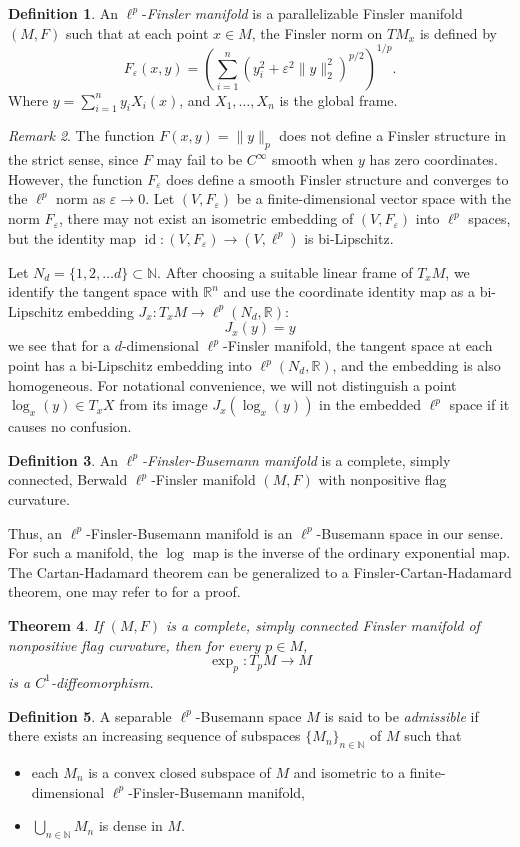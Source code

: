 \documentclass{article}
\theoremstyle{plain}
\newtheorem{theorem}{Theorem}[section]
\theoremstyle{definition}
\newtheorem{definition}[theorem]{Definition}
\renewcommand{\epsilon}{\varepsilon}
\theoremstyle{remark}
\newtheorem{remark}[theorem]{Remark}
\DeclareMathOperator{\id}{id}
\def\IR{\mathbb R}
\def\IN{\mathbb N}
\begin{document}
	\begin{definition}
	An $\ell^p$-\emph{Finsler manifold} is a parallelizable Finsler manifold $(M, F)$ such that at each point $x\in M$, the Finsler norm on $TM_x$ is defined by
	$$F_{\epsilon}(x,y)=\left(\sum_{i=1}^n(y_i^2+\varepsilon^2\|y\|_2^2)^{p/2}\right)^{1/p}.$$
	Where $y=\sum_{i=1}^n y_iX_i(x)$, and $X_1,\ldots,X_n$ is the global frame.
\end{definition}
	\begin{remark}
		The function $F(x,y)=\|y\|_p$ does not define a Finsler structure in the strict sense, since $F$ may fail to be $C^\infty$ smooth when $y$ has zero coordinates. However, the function $F_{\epsilon}$ does define a smooth Finsler structure and converges to the $\ell^p$ norm as $\epsilon\to 0$. Let $(V,F_{\epsilon})$ be a finite-dimensional vector space with the norm $F_{\epsilon}$, there may not exist an isometric embedding of $(V,F_{\epsilon})$ into $\ell^p$ spaces, but the identity map $\id:(V,F_{\epsilon}) \to (V,\ell^p)$ is bi-Lipschitz. 
	\end{remark}
	Let $N_d=\{1,2,\dots d\}\subset \IN$. After choosing a suitable linear frame of \(T_xM\), we identify the tangent space with \(\mathbb R^n\) and use the coordinate identity map as a bi-Lipschitz embedding $J_x: T_xM\to \ell^p(N_d,\IR)$:
	$$J_x(y)=y$$ we see that for a $d$-dimensional $\ell^p$-Finsler manifold, the tangent space at each point has a bi-Lipschitz embedding into $\ell^p(N_d,\IR)$, and the embedding is also homogeneous. For notational convenience, we will not distinguish a point $\log_x(y) \in T_xX$ from its image $J_x(\log_x(y))$ in the embedded $\ell^p$ space if it causes no confusion.
	\begin{definition}
		An \emph{$\ell^p$-Finsler-Busemann manifold} is a complete, simply connected, Berwald $\ell^p$-Finsler manifold $(M, F)$ with nonpositive flag curvature. 
	\end{definition}
	Thus, an $\ell^p$-Finsler-Busemann manifold is an $\ell^p$-Busemann space in our sense. For such a manifold, the $\log$ map is the inverse of the ordinary exponential map. The Cartan-Hadamard theorem can be generalized to a Finsler-Cartan-Hadamard theorem, one may refer to \cite{BaoChernShen2000} for a  proof.
	\begin{theorem}
		If $(M,F)$ is a complete, simply connected Finsler manifold of nonpositive flag curvature, then for every $p\in M$,
		$$
		\exp_p:T_pM\longrightarrow M
		$$
		is a $C^1$-diffeomorphism.
	\end{theorem}
	\begin{definition}
		A separable $\ell^p$-Busemann space $M$ is said to be \emph{admissible} if there exists an increasing sequence of subspaces $\{M_n\}_{n\in\mathbb{N}}$ of $M$ such that
		\begin{itemize}
			\item[(1)] each $M_n$ is a convex closed subspace of $M$ and isometric to a finite-dimensional $\ell^p$-Finsler-Busemann manifold,
			\item[(2)] $\bigcup_{n\in\mathbb{N}}M_n$ is dense in $M$.
		\end{itemize}
	\end{definition}
\end{document}
